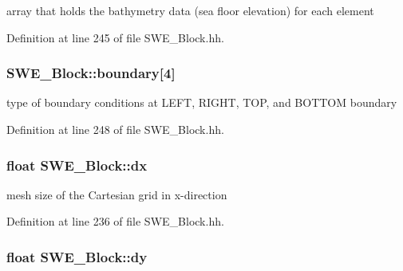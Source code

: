 array that holds the bathymetry data (sea floor elevation) for each element 



Definition at line 245 of file S\+W\+E\+\_\+\+Block.\+hh.

\subsubsection[{\texorpdfstring{boundary}{boundary}}]{ S\+W\+E\+\_\+\+Block\+::boundary\mbox{[}4\mbox{]}\hspace{0.3cm}{\ttfamily [protected]}}\hypertarget{classSWE__Block_a0e56d0cad169abd4f5de95d9f96c7a73}{}\label{classSWE__Block_a0e56d0cad169abd4f5de95d9f96c7a73}


type of boundary conditions at L\+E\+FT, R\+I\+G\+HT, T\+OP, and B\+O\+T\+T\+OM boundary 



Definition at line 248 of file S\+W\+E\+\_\+\+Block.\+hh.

\subsubsection[{\texorpdfstring{dx}{dx}}]{\setlength{\rightskip}{0pt plus 5cm}float S\+W\+E\+\_\+\+Block\+::dx\hspace{0.3cm}{\ttfamily [protected]}}\hypertarget{classSWE__Block_af2262b1cce6834d939c5a2315dae49b1}{}\label{classSWE__Block_af2262b1cce6834d939c5a2315dae49b1}


mesh size of the Cartesian grid in x-\/direction 



Definition at line 236 of file S\+W\+E\+\_\+\+Block.\+hh.

\subsubsection[{\texorpdfstring{dy}{dy}}]{\setlength{\rightskip}{0pt plus 5cm}float S\+W\+E\+\_\+\+Block\+::dy\hspace{0.3cm}{\ttfamily [protected]}}\hypertarget{classSWE__Block_a9feb988748d792bca0ca0508e43bd87f}{}\label{classSWE__Block_a9feb988748d792bca0ca0508e43bd87f}


